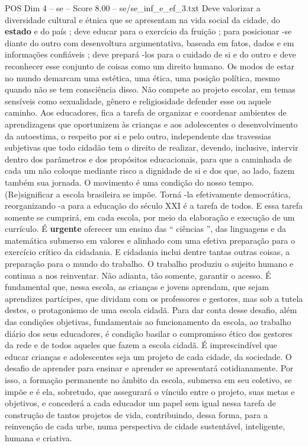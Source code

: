 \begin{textsample}{POS Dim 4 – se – Score 8.00 – se/se\_inf\_e\_ef\_3.txt}
Deve valorizar a diversidade cultural e étnica que se apresentam na vida social da cidade, do \textbf{estado} e do país ; deve educar para o exercício da fruição ; para posicionar -se diante do outro com desenvoltura argumentativa, baseada em fatos, dados e em informações confiáveis ; deve prepará -los para o cuidado de si e do outro e deve reconhecer esse conjunto de coisas como um direito humano.
Os modos de estar no mundo demarcam uma estética, uma ética, uma posição política, mesmo quando não se tem consciência disso.
Não compete ao projeto escolar, em temas sensíveis como sexualidade, gênero e religiosidade defender esse ou aquele caminho.
Aos educadores, fica a tarefa de organizar e coordenar ambientes de aprendizagens que oportunizem às crianças e aos adolescentes o desenvolvimento da autoestima, o respeito por si e pelo outro, independente das travessias subjetivas que todo cidadão tem o direito de realizar, devendo, inclusive, intervir dentro dos parâmetros e dos propósitos educacionais, para que a caminhada de cada um não coloque mediante risco a dignidade de si e dos que, ao lado, fazem também sua jornada.
O movimento é uma condição do nosso tempo. (Re)significar a escola brasileira se impõe.
Torná -la efetivamente democrática, reorganizando -a para a educação do século XXI é a tarefa de todos.
E essa tarefa somente se cumprirá, em cada escola, por meio da elaboração e execução de um currículo.
É \textbf{urgente} oferecer um ensino das “ ciências ”, das linguagens e da matemática submerso em valores e alinhado com uma efetiva preparação para o exercício crítico da cidadania.
E cidadania inclui dentre tantas outras coisas, a preparação para o mundo do trabalho.
O trabalho produziu o sujeito humano e continua a nos reinventar.
Não adianta, tão somente, garantir o acesso.
É fundamental que, nessa escola, as crianças e jovens aprendam, que sejam aprendizes partícipes, que dividam com os professores e gestores, mas sob a tutela destes, o protagonismo de uma escola cidadã.
Para dar conta desse desafio, além das condições objetivas, fundamentais ao funcionamento da escola, ao trabalho diário dos seus educadores, é condição basilar o compromisso ético dos gestores da rede e de todos aqueles que fazem a escola cidadã.
É imprescindível que educar crianças e adolescentes seja um projeto de cada cidade, da sociedade.
O desafio de aprender para ensinar e aprender se apresentará cotidianamente.
Por isso, a formação permanente no âmbito da escola, submersa em seu coletivo, se impõe e é ela, sobretudo, que assegurará o vínculo entre o projeto, suas metas e objetivos, e concederá a cada educador um papel sem igual nessa tarefa de construção de tantos projetos de vida, contribuindo, dessa forma, para a reinvenção de cada urbe, numa perspectiva de cidade sustentável, inteligente, humana e criativa.

\end{textsample}
